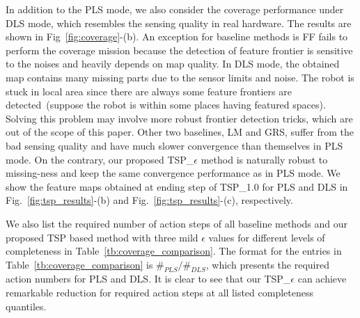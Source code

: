 In addition to the PLS mode, we also consider the coverage performance under DLS mode, which resembles the sensing quality in real hardware. The results are shown in Fig~\ref{fig:coverage}-(b). An exception for baseline methods is FF fails to perform the coverage mission because the detection of feature frontier is sensitive to the noises and heavily depends on map quality. In DLS mode, the obtained map contains many missing parts due to the sensor limits and noise. The robot is stuck in local area since there are always some feature frontiers are detected~(suppose the robot is within some places having featured spaces). Solving this problem may involve more robust frontier detection tricks, which are out of the scope of this paper. Other two baselines, LM and GRS, suffer from the bad sensing quality and have much slower convergence than themselves in PLS mode. On the contrary, our proposed TSP\_$\epsilon$ method is naturally robust to missing-ness and keep the same convergence performance as in PLS mode. We show the feature maps obtained at ending step of TSP\_{1.0} for PLS and DLS in Fig.~\ref{fig:tsp_results}-(b) and Fig.~\ref{fig:tsp_results}-(c), respectively.

We also list the required number of action steps of all baseline methods and our proposed TSP based method with three mild $\epsilon$ values for different levels of completeness in Table~\ref{tb:coverage_comparison}. The format for the entries in Table~\ref{tb:coverage_comparison} is $\#_{PLS} / \#_{DLS}$, which presents the required action numbers for PLS and DLS. It is clear to see that our TSP\_$\epsilon$ can achieve remarkable reduction for required action steps at all listed completeness quantiles.









